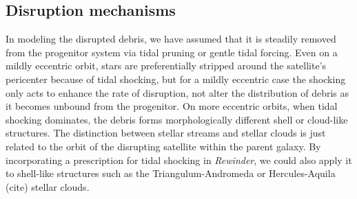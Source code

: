 \documentclass[letterpaper,12pt,preprint]{aastex}
\newcommand{\rewinder}{\emph{Rewinder}}
\begin{document}
\subsection{Disruption mechanisms}
In modeling the disrupted debris, we have assumed that it is steadily removed from the progenitor system via tidal pruning or gentle tidal forcing. Even on a mildly eccentric orbit, stars are preferentially stripped around the satellite's pericenter because of tidal shocking, but for a mildly eccentric case the shocking only acts to enhance the rate of disruption, not alter the distribution of debris as it becomes unbound from the progenitor. On more eccentric orbits, when tidal shocking dominates, the debris forms morphologically different shell or cloud-like structures. The distinction between stellar streams and stellar clouds is just related to the orbit of the disrupting satellite within the parent galaxy. By incorporating a prescription for tidal shocking in \rewinder, we could also apply it to shell-like structures such as the Triangulum-Andromeda \citep{rochapinto04} or Hercules-Aquila (cite) stellar clouds.
\end{document}
